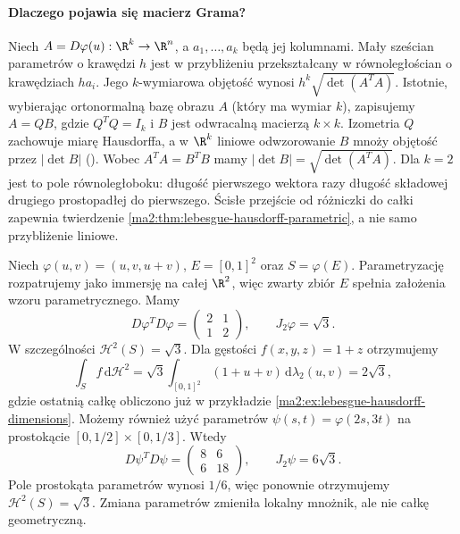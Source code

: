 \paragraph{Dlaczego pojawia się macierz Grama?}
Niech $A=D\varphi(u):\R^k\to\R^n$,
a $a_1,\ldots,a_k$ będą jej kolumnami.
Mały sześcian parametrów o krawędzi $h$
jest w przybliżeniu przekształcany
w równoległościan o krawędziach $ha_i$.
Jego $k$-wymiarowa objętość wynosi
$h^k\sqrt{\det(A^TA)}$.
Istotnie, wybierając ortonormalną bazę
obrazu $A$ (który ma wymiar $k$),
zapisujemy $A=QB$, gdzie $Q^TQ=I_k$
i $B$ jest odwracalną macierzą $k\times k$.
Izometria $Q$ zachowuje miarę Hausdorffa,
a w $\R^k$ liniowe odwzorowanie $B$
mnoży objętość przez $|\det B|$
().
Wobec $A^TA=B^TB$ mamy
$|\det B|=\sqrt{\det(A^TA)}$.
Dla $k=2$ jest to pole równoległoboku:
długość pierwszego wektora razy długość
składowej drugiego prostopadłej do pierwszego.
Ścisłe przejście od różniczki do całki
zapewnia twierdzenie
\ref{ma2:thm:lebesgue-hausdorff-parametric},
a nie samo przybliżenie liniowe.

\begin{przyklad}
\label{ma2:ex:lebesgue-hausdorff-tilted}
Niech $\varphi(u,v)=(u,v,u+v)$,
$E=[0,1]^2$ oraz $S=\varphi(E)$.
Parametryzację rozpatrujemy jako immersję
na całej $\R^2$, więc zwarty zbiór $E$
spełnia założenia wzoru parametrycznego.
Mamy
\[
 D\varphi^TD\varphi=
 \begin{pmatrix}2&1\\1&2\end{pmatrix},
 \qquad J_2\varphi=\sqrt3.
\]
W szczególności $\mathcal H^2(S)=\sqrt3$.
Dla gęstości $f(x,y,z)=1+z$ otrzymujemy
\[
 \int_S f\,\mathrm d\mathcal H^2
 =\sqrt3\int_{[0,1]^2}(1+u+v)\,
       \mathrm d\lambda_2(u,v)=2\sqrt3,
\]
gdzie ostatnią całkę obliczono już
w przykładzie \ref{ma2:ex:lebesgue-hausdorff-dimensions}.
Możemy również użyć parametrów
$\psi(s,t)=\varphi(2s,3t)$ na prostokącie
$[0,1/2]\times[0,1/3]$.
Wtedy
\[
 D\psi^TD\psi=
 \begin{pmatrix}8&6\\6&18\end{pmatrix},
 \qquad J_2\psi=6\sqrt3.
\]
Pole prostokąta parametrów wynosi $1/6$,
więc ponownie otrzymujemy $\mathcal H^2(S)=\sqrt3$.
Zmiana parametrów zmieniła lokalny
mnożnik, ale nie całkę geometryczną.
\end{przyklad}

